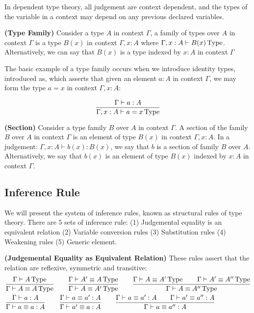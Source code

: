 In dependent type theory, all judgement are context dependent, and the types of the variable in a context may depend on any previous declared variables.

\begin{definition}{\textbf{(Type Family)}}
    Consider a type $A$ in context $\Gamma$, a family of types over $A$ in context $\Gamma$ is a type $B(x)$ in context $\Gamma,x:A$ where $\Gamma,x:A\vdash B(x)\operatorname{Type} $. Alternatively, we can say that $B(x)$ is a type indexed by $x:A$ in context $\Gamma$
\end{definition}


The basic example of a type family occurs when we introduce identity types, introduced as, which asserts that given an element $a:A$ in context $\Gamma$, we may form the type $a=x$ in context $\Gamma,x:A$:

\begin{equation*}
    \frac{\Gamma\vdash a:A}{\Gamma,x:A\vdash a=x\operatorname{Type} }
\end{equation*}

\begin{definition}{\textbf{(Section)}}
    Consider a type family $B$ over $A$ in context $\Gamma$. A section of the family $B$ over $A$ in context $\Gamma$ is an element of type $B(x)$ in context $\Gamma,x:A$. In a judgement: $\Gamma,x:A\vdash b(x):B(x)$, we say that $b$ is a section of family $B$ over $A$. Alternatively, we say that $b(x)$ is an element of type $B(x)$ indexed by $x:A$ in context $\Gamma$.
\end{definition}

\subsection{Inference Rule}

We will present the system of inference rules, known as structural rules of type theory. There are $5$ sets of inference rule: (1) Judgemental equality is an equivalent relation (2) Variable conversion rules (3) Substitution rules (4) Weakening rules (5) Generic element.


\begin{definition}{\textbf{(Judgemental Equality as Equivalent Relation)}}
    These rules assert that the relation are reflexive, symmetric and transitive:
    \begin{equation*}
    \begin{aligned}
        &\frac{\Gamma\vdash A\operatorname{Type} }{\Gamma\vdash A\equiv A\operatorname{Type} } \qquad \frac{\Gamma\vdash A'\equiv A\operatorname{Type} }{\Gamma\vdash A\equiv A'\operatorname{Type} } \qquad \frac{\Gamma\vdash A\equiv A'\operatorname{Type} \qquad \Gamma\vdash A'\equiv A''\operatorname{Type} }{\Gamma\vdash A\equiv A''\operatorname{Type} } \\
        &\frac{\Gamma\vdash a:A}{\Gamma\vdash a\equiv a:A} \qquad \frac{\Gamma\vdash a\equiv a':A}{\Gamma\vdash a'\equiv a:A} \qquad \frac{\Gamma\vdash a\equiv a':A\qquad \Gamma\vdash a'\equiv a'':A}{\Gamma\vdash a\equiv a'':A}
    \end{aligned}
    \end{equation*}
\end{definition}

